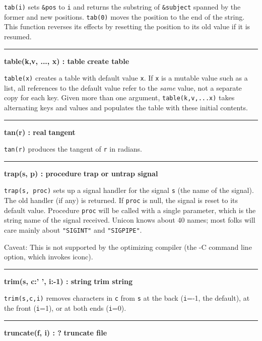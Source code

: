 \noindent
{}\texttt{tab(i)} sets \texttt{\&pos} to \texttt{i} and
returns the substring of \texttt{\&subject} spanned by the former and
new positions. \texttt{tab(0)} moves the position to the end of the
string. This function reverses its effects by resetting the position to
its old value if it is resumed.

\bigskip\hrule\vspace{0.1cm}
\noindent
{\bf table(k,v, ..., x) : table } \hfill {\bf create table}

\noindent
{}\texttt{table(x)} creates a table with default value
\texttt{x}. If \texttt{x} is a mutable value such as a list, all
references to the default value refer to the \textit{same} value, not a
separate copy for each key. Given more than one argument,
\texttt{table(k,v,...x)} takes alternating keys and values and
populates the table with these initial contents.

\bigskip\hrule\vspace{0.1cm}
\noindent
{\bf tan(r) : real } \hfill {\bf tangent}

\noindent
{}\texttt{tan(r)} produces the tangent of \texttt{r} in
radians.

\bigskip\hrule\vspace{0.1cm}
\noindent
{\bf trap(s, p) : procedure } \hfill {\bf trap or untrap signal}

\noindent
{}\texttt{trap(s, proc)} sets up a signal handler for
the signal \texttt{s} (the name of the signal). The old handler (if
any) is returned. If \texttt{proc} is null, the signal is reset to its
default value. Procedure \texttt{proc} will be called with a single parameter,
which is the string name of the signal received. Unicon knows about 40
names; most folks will care mainly about
\texttt{"SIGINT"} and \texttt{"SIGPIPE"}.

Caveat: This is not supported by the optimizing
compiler (the -C command line option, which invokes iconc).

\bigskip\hrule\vspace{0.1cm}
\noindent
{\bf trim(s, c:' ', i:{}-1) : string } \hfill {\bf trim string}

\noindent
{}\texttt{trim(s,c,i)} removes characters in \texttt{c}
from \texttt{s} at the back (\texttt{i}=-1, the default), at the front
(\texttt{i}=1), or at both ends (\texttt{i}=0).

\bigskip\hrule\vspace{0.1cm}
\noindent
{\bf truncate(f, i) : ? } \hfill {\bf truncate file}

